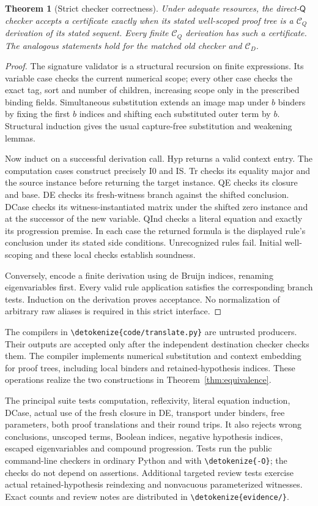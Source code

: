 \documentclass[11pt,letterpaper]{article}
\newtheorem{theorem}{Theorem}[section]
\theoremstyle{definition}\newtheorem{definition}[theorem]{Definition}
\theoremstyle{remark}\newtheorem{remark}[theorem]{Remark}
\newcommand{\CD}{\mathcal C_D}
\newcommand{\CQ}{\mathcal C_Q}
\newcommand{\Q}{\mathsf Q}
\newcommand{\file}[1]{\expandafter\nolinkurl\expandafter{\detokenize{#1}}}
\begin{document}
\begin{theorem}[Strict checker correctness]
Under adequate resources, the direct-$\Q$ checker accepts a certificate
exactly when its stated well-scoped proof tree is a $\CQ$ derivation of
its stated sequent. Every finite $\CQ$ derivation has such a certificate.
The analogous statements hold for the matched old checker and $\CD$.
\end{theorem}
\begin{proof}
The signature validator is a structural recursion on finite expressions.
Its variable case checks the current numerical scope; every other case
checks the exact tag, sort and number of children, increasing scope only
in the prescribed binding fields. Simultaneous substitution extends an
image map under $b$ binders by fixing the first $b$ indices and shifting
each substituted outer term by $b$. Structural induction gives the usual
capture-free substitution and weakening lemmas.

Now induct on a successful derivation call. Hyp returns a valid context
entry. The computation cases construct precisely I0 and IS. Tr checks
its equality major and the source instance before returning the target
instance. QE checks its closure and base. DE checks its fresh-witness
branch against the shifted conclusion. DCase checks its witness-instantiated
matrix under the shifted zero instance and at the successor of the new
variable. QInd checks a literal equation and exactly its progression
premise. In each case the returned formula is the displayed rule's
conclusion under its stated side conditions. Unrecognized rules fail.
Initial well-scoping and these local checks establish soundness.

Conversely, encode a finite derivation using de Bruijn indices, renaming
eigenvariables first. Every valid rule application satisfies the corresponding
branch tests. Induction on the derivation proves acceptance. No
normalization of arbitrary raw aliases is required in this strict interface.
\end{proof}

The compilers in \file{code/translate.py} are untrusted producers. Their
outputs are accepted only after the independent destination checker checks
them. The compiler implements numerical substitution and context
embedding for proof trees, including local binders and retained-hypothesis
indices. These operations realize the two constructions in
Theorem~\ref{thm:equivalence}.

The principal suite tests computation, reflexivity, literal equation
induction, DCase, actual use of the fresh closure in DE, transport under
binders, free parameters, both proof translations and their round trips.
It also rejects wrong conclusions, unscoped terms, Boolean indices,
negative hypothesis indices, escaped eigenvariables and compound
progression. Tests run the public command-line checkers in ordinary
Python and with \file{-O}; the checks do not depend on assertions.
Additional targeted review tests exercise actual retained-hypothesis
reindexing and nonvacuous parameterized witnesses. Exact counts and
review notes are distributed in \file{evidence/}.
\end{document}
